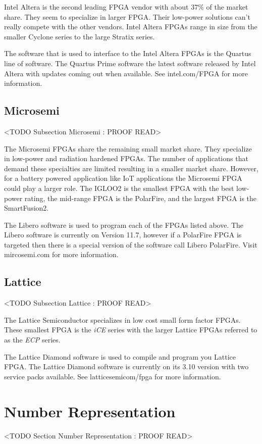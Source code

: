 Intel Altera is the second leading \ac{FPGA} vendor with about 37\% of the market share. They seem to specialize in larger \ac{FPGA}. Their low-power solutions can't really compete with the other vendors. Intel Altera \ac{FPGA}s range in size from the smaller Cyclone series to the large Stratix series. 

The software that is used to interface to the Intel Altera \ac{FPGA}s is the Quartus line of software. The Quartus Prime software the latest software released by Intel Altera with updates coming out when available. See intel.com/FPGA for more information.
	
\subsection{Microsemi}
	<TODO Subsection Microsemi : PROOF READ>

The Microsemi \ac{FPGA}s share the remaining small market share. They specialize in low-power and radiation hardened \ac{FPGA}s. The number of applications that demand these specialties are limited resulting in a smaller market share. However, for a battery powered application like \ac{IoT} applications the Microsemi \ac{FPGA} could play a larger role. The IGLOO2 is the smallest \ac{FPGA} with the best low-power rating, the mid-range \ac{FPGA} is the PolarFire, and the largest \ac{FPGA} is the SmartFusion2. 

The Libero software is used to program each of the \ac{FPGA}s listed above. The Libero software is currently on Version 11.7, however if a PolarFire \ac{FPGA} is targeted then there is a special version of the software call Libero PolarFire. Visit	mircosemi.com for more information. 
	
\subsection{Lattice}
	<TODO Subsection Lattice : PROOF READ>
	
The Lattice Semiconductor specializes in low cost small form factor \ac{FPGA}s. These smallest \ac{FPGA} is the \emph{iCE} series with the larger Lattice \ac{FPGA}s referred to as the \emph{ECP} series. 

The Lattice Diamond software is used to compile and program you Lattice FPGA. The Lattice Diamond software is currently on its 3.10 version with two service packs available. See latticesemicom/fpga for more information. 

\section{Number Representation}
	<TODO Section Number Representation : PROOF READ>

